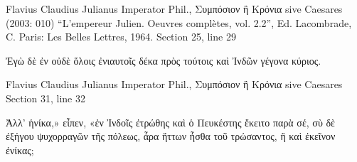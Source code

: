 \documentclass[12pt,letterpaper,twoside,final]{memoir}
\begin{document}
\begin{greek}
Flavius Claudius Julianus Imperator Phil., Συμπόσιον ἢ Κρόνια sive Caesares (2003: 010)
“L'empereur Julien. Oeuvres complètes, vol. 2.2”, Ed. Lacombrade, C.
Paris: Les Belles Lettres, 1964.
Section 25, line 29

                                                             Ἐγὼ 
δὲ ἐν οὐδὲ ὅλοις ἐνιαυτοῖς δέκα πρὸς τούτοις καὶ Ἰνδῶν 
γέγονα κύριος. 



Flavius Claudius Julianus Imperator Phil., Συμπόσιον ἢ Κρόνια sive Caesares 
Section 31, line 32

             Ἀλλ' ἡνίκα,» εἶπεν, «ἐν Ἰνδοῖς ἐτρώθης καὶ 
ὁ Πευκέστης ἔκειτο παρὰ σέ, σὺ δὲ ἐξήγου ψυχορραγῶν 
τῆς πόλεως, ἆρα ἥττων ἦσθα τοῦ τρώσαντος, ἢ καὶ ἐκεῖνον 
ἐνίκας; 

\end{greek}
\end{document}
